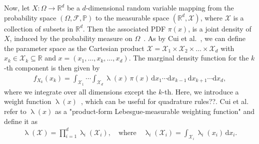 Now, let $X: \Omega \longrightarrow \mathbb{R}^d$ be a $d$-dimensional random variable mapping from the probability space $(\Omega, \mathcal{F}, \mathbb{P})$ to the measurable space $(\mathbb{R}^d, \mathcal{X})$, where $\mathcal{X}$ is a collection of subsets in $\mathbb{R}^d$.
Then the associated PDF $\pi(x)$, is a joint density of $X$, induced by the probability measure on $\Omega$~\cite{VesaInvLect, kopp2004measintprob}.
As by Cui et al.~\cite{cui2022deep}, we can define the parameter space as the Cartesian product $\mathcal{X} = \mathcal{X}_1 \times \mathcal{X}_2 \times \dots \times \mathcal{X}_d$ with $ x_k \in \mathcal{X}_k \subseteq \mathbb{R}$ and $x = ( x_1,\dots ,x_k,\dots,x_d )$.
The marginal density function for the $k$-th component is then given by
\begin{align}
	f_{X_k}(x_k) = \int_{\mathcal{X}_1} \cdots \int_{\mathcal{X}_d} \uplambda(x) \, \pi(x) \, \mathrm{d}x_1 \cdots \mathrm{d}x_{k-1} \, \mathrm{d}x_{k+1} \cdots \mathrm{d}x_d,
\end{align}
where we integrate over all dimensions except the $k$-th.
Here, we introduce a weight function $\uplambda(x)$~\cite{davis2007methods}, which can be useful for quadrature rules??. 
Cui et al.~\cite{cui2022deep} refer to $\uplambda(x)$ as a "product-form Lebesgue-measurable weighting function" and define it as
\begin{align*}
	\uplambda(\mathcal{X}) = \prod_{i = 1}^{d} \uplambda_i(\mathcal{X}_i), \quad \text{where} \quad \uplambda_i(\mathcal{X}_i) = \int_{\mathcal{X}_i} \uplambda_i(x_i) \, \mathrm{d}x_i.
\end{align*}

